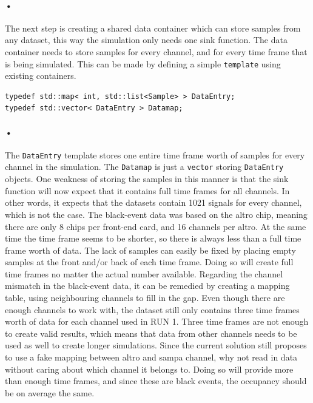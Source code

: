 \documentclass[a4paper, 12pt]{report}
\newcommand{\codeword}[1]{\texttt{#1}}
\begin{document}
\paragraph{•}
The next step is creating a shared data container which can store samples from any dataset, this way the simulation only needs one sink function.
The data container needs to store samples for every channel, and for every time frame that is being simulated.
This can be made by defining a simple \codeword{template} using existing containers.

\begin{lstlisting}[caption=Data container., label=lst:data-template]
typedef std::map< int, std::list<Sample> > DataEntry;
typedef std::vector< DataEntry > Datamap;
\end{lstlisting}

\paragraph{•}
The \codeword{DataEntry} template stores one entire time frame worth of samples for every channel in the simulation.
The \codeword{Datamap} is just a \codeword{vector} storing \codeword{DataEntry} objects.
One weakness of storing the samples in this manner is that the sink function will now expect that it contains full time frames for all channels.
In other words, it expects that the datasets contain 1021 signals for every channel, which is not the case.
The black-event data was based on the \gls{altro} chip, meaning there are only 8 chips per front-end card, and 16 channels per \gls{altro}.
At the same time the time frame seems to be shorter, so there is always less than a full time frame worth of data.
The lack of samples can easily be fixed by placing empty samples at the front and/or back of each time frame.
Doing so will create full time frames no matter the actual number available.
Regarding the channel mismatch in the black-event data, it can be remedied by creating a mapping table, using neighbouring channels to fill in the gap.
Even though there are enough channels to work with, the dataset still only contains three time frames worth of data for each channel used in RUN 1.
Three time frames are not enough to create valid results, which means that data from other channels needs to be used as well to create longer simulations.
Since the current solution still proposes to use a fake mapping between \gls{altro} and \gls{sampa} channel, why not read in data without caring about which channel it belongs to.
Doing so will provide more than enough time frames, and since these are black events, the occupancy should be on average the same.
\end{document}
